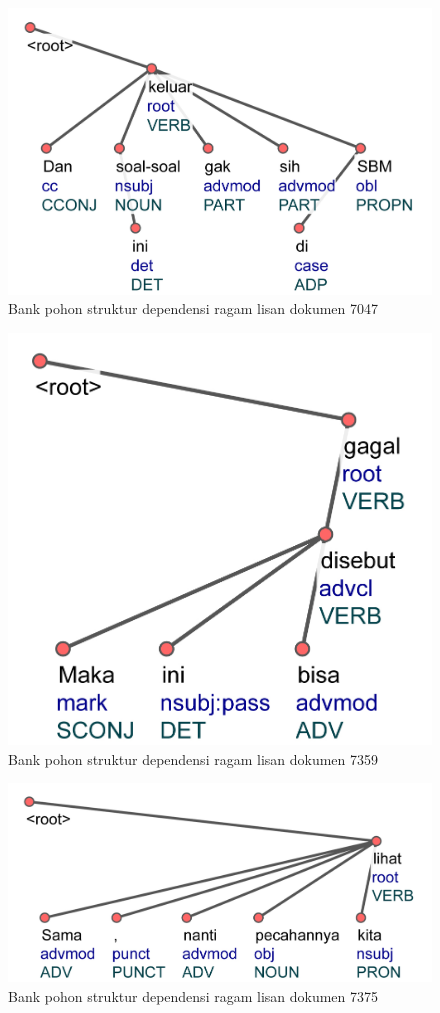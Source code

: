 \begin{figure}
	\centering \includegraphics[width=0.5
	\textwidth] {pics/lampiran/lampiranls7047.jpg} 
	\caption[]{Bank pohon struktur dependensi ragam lisan dokumen 7047} 
	\label{fig:lampiranls7047} 
\end{figure}


\begin{figure}
	\centering \includegraphics[width=0.35
	\textwidth] {pics/lampiran/lampiranls7359.jpg} 
	\caption[]{Bank pohon struktur dependensi ragam lisan dokumen 7359} 
	\label{fig:lampiranls7359} 
\end{figure}

\begin{figure}
	\centering \includegraphics[width=0.5
	\textwidth] {pics/lampiran/lampiranls7375.jpg} 
	\caption[]{Bank pohon struktur dependensi ragam lisan dokumen 7375} 
	\label{fig:lampiranls7375} 
\end{figure}

